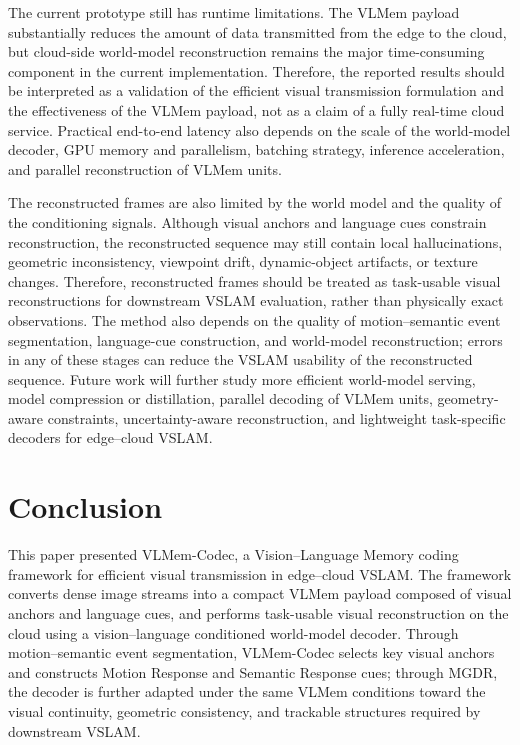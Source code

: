 \documentclass[journal]{IEEEtran}
\newcommand{\VLMemCodec}{VLMem-Codec}
\begin{document}
The current prototype still has runtime limitations. The VLMem payload substantially reduces the amount of data transmitted from the edge to the cloud, but cloud-side world-model reconstruction remains the major time-consuming component in the current implementation. Therefore, the reported results should be interpreted as a validation of the efficient visual transmission formulation and the effectiveness of the VLMem payload, not as a claim of a fully real-time cloud service. Practical end-to-end latency also depends on the scale of the world-model decoder, GPU memory and parallelism, batching strategy, inference acceleration, and parallel reconstruction of VLMem units.

The reconstructed frames are also limited by the world model and the quality of the conditioning signals. Although visual anchors and language cues constrain reconstruction, the reconstructed sequence may still contain local hallucinations, geometric inconsistency, viewpoint drift, dynamic-object artifacts, or texture changes. Therefore, reconstructed frames should be treated as task-usable visual reconstructions for downstream VSLAM evaluation, rather than physically exact observations. The method also depends on the quality of motion--semantic event segmentation, language-cue construction, and world-model reconstruction; errors in any of these stages can reduce the VSLAM usability of the reconstructed sequence. Future work will further study more efficient world-model serving, model compression or distillation, parallel decoding of VLMem units, geometry-aware constraints, uncertainty-aware reconstruction, and lightweight task-specific decoders for edge--cloud VSLAM.

\section{Conclusion}
\label{sec:conclusion}

This paper presented \VLMemCodec{}, a Vision--Language Memory coding framework for efficient visual transmission in edge--cloud VSLAM. The framework converts dense image streams into a compact VLMem payload composed of visual anchors and language cues, and performs task-usable visual reconstruction on the cloud using a vision--language conditioned world-model decoder. Through motion--semantic event segmentation, \VLMemCodec{} selects key visual anchors and constructs Motion Response and Semantic Response cues; through MGDR, the decoder is further adapted under the same VLMem conditions toward the visual continuity, geometric consistency, and trackable structures required by downstream VSLAM.
\end{document}
